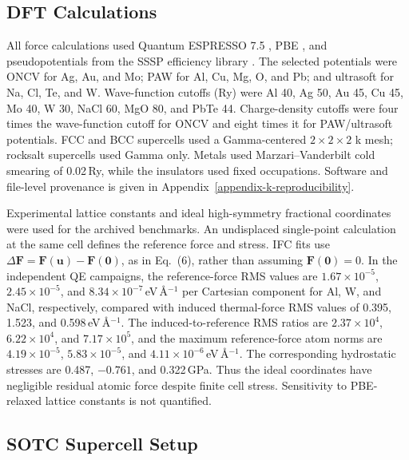 \documentclass[aps,prb,reprint,amsmath,amssymb,floatfix]{revtex4-2}
\begin{document}
\subsection{DFT Calculations}\label{dft-calculations}

\color{revisionblue}
All force calculations used Quantum ESPRESSO 7.5 \cite{ref46}, PBE
\cite{ref17}, and pseudopotentials from the SSSP efficiency library
\cite{ref47}. The selected potentials were ONCV for Ag, Au, and Mo; PAW for
Al, Cu, Mg, O, and Pb; and ultrasoft for Na, Cl, Te, and W. Wave-function
cutoffs (Ry) were Al 40, Ag 50, Au 45, Cu 45, Mo 40, W 30, NaCl 60,
MgO 80, and PbTe 44. Charge-density cutoffs were four times the
wave-function cutoff for ONCV and eight times it for PAW/ultrasoft
potentials. FCC and BCC supercells used a Gamma-centered
\(2\times2\times2\) k mesh; rocksalt supercells used Gamma only. Metals used
Marzari--Vanderbilt cold smearing \cite{ref18} of 0.02\,Ry, while the
insulators used fixed occupations. Software and file-level provenance is given in
Appendix~\ref{appendix-k-reproducibility}.
\color{black}

\color{revisionblue}
Experimental lattice constants and ideal high-symmetry fractional coordinates
were used for the archived benchmarks. An undisplaced single-point calculation
at the same cell defines the reference force and stress. IFC fits use
\(\Delta\mathbf F=\mathbf F(\mathbf u)-\mathbf F(\mathbf0)\), as in Eq.~(6),
rather than assuming \(\mathbf F(\mathbf0)=0\). In the independent QE campaigns,
the reference-force RMS values are \(1.67\times10^{-5}\),
\(2.45\times10^{-5}\), and \(8.34\times10^{-7}\)\,eV\,\AA\(^{-1}\) per
Cartesian component for Al, W, and NaCl, respectively, compared with induced
thermal-force RMS values of 0.395, 1.523, and 0.598\,eV\,\AA\(^{-1}\).
The induced-to-reference RMS ratios are \(2.37\times10^4\),
\(6.22\times10^4\), and \(7.17\times10^5\), and the maximum
reference-force atom norms are \(4.19\times10^{-5}\),
\(5.83\times10^{-5}\), and \(4.11\times10^{-6}\)\,eV\,\AA\(^{-1}\).
The corresponding hydrostatic stresses are 0.487, \(-0.761\), and
0.322\,GPa. Thus the ideal coordinates have negligible residual atomic force
despite finite cell stress. Sensitivity to PBE-relaxed lattice constants is not
quantified.
\color{black}

\subsection{SOTC Supercell Setup}\label{sotc-supercell-setup}
\end{document}

